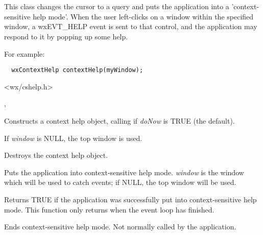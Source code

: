 \section{}\label{wxcontexthelp}

This class changes the cursor to a query and puts the application into a 'context-sensitive help mode'.
When the user left-clicks on a window within the specified window, a wxEVT\_HELP event is
sent to that control, and the application may respond to it by popping up some help.

For example:

\begin{verbatim}
  wxContextHelp contextHelp(myWindow);
\end{verbatim}




<wx/cshelp.h>


,\rtfsp
{}




Constructs a context help object, calling  if\rtfsp
{\it doNow} is TRUE (the default).

If {\it window} is NULL, the top window is used.



Destroys the context help object.

\label{wxcontexthelpbegincontexthelp}


Puts the application into context-sensitive help mode. {\it window} is the window
which will be used to catch events; if NULL, the top window will be used.

Returns TRUE if the application was successfully put into context-sensitive help mode.
This function only returns when the event loop has finished.

\label{wxcontexthelpendcontexthelp}


Ends context-sensitive help mode. Not normally called by the application.

